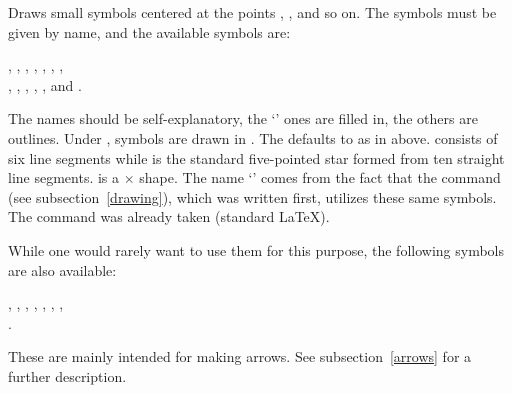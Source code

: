 \documentclass[letterpaper]{article}
\begin{document}
\begin{cd}
%
%
\end{cd}

Draws small symbols centered at the points , ,
and so on. The symbols must be given by name, and the available symbols
are:
\begin{display}
  ,
  ,
  ,
  ,
  ,
  ,
  ,\\
  ,
  ,
  ,
  ,
  , and
  .
\end{display}
The names should be self-explanatory, the `' ones are filled
in, the others are outlines. Under , symbols are drawn in
. The  defaults to  as in
 above.  consists of six line segments while
 is the standard five-pointed star formed from ten straight
line segments.  is a $\times$ shape. The name
`' comes from the fact that the  command (see
subsection~\ref{drawing}), which was written first, utilizes these same
symbols. The command  was already taken (standard \LaTeX{}).

While one would rarely want to use them for this purpose, the following
symbols are also available:
\begin{display}
  ,
  ,
  ,
  ,
  ,
  ,
  ,\\
  .
\end{display}
These are mainly intended for making arrows. See subsection~\ref{arrows}
for a further description.
\end{document}
